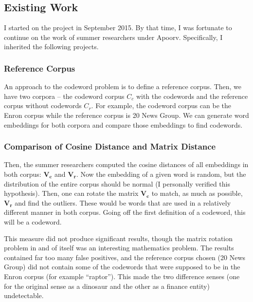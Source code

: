 \subsection{Existing Work}

I started on the project in September 2015. By that time, I was fortunate to continue on the work of summer researchers under Apoorv. Specifically, I inherited the following projects.

\subsubsection{Reference Corpus}

An approach to the codeword problem is to define a reference corpus. Then, we have two corpora -- the codeword corpus $C_c$ with the codewords and the reference corpus without codewords $C_r$. For example, the codeword corpus can be the Enron corpus while the reference corpus is 20 News Group. We can generate word embeddings for both corpora and compare those embeddings to find codewords.

\subsubsection{Comparison of Cosine Distance and Matrix Distance}

Then, the summer researchers computed the cosine distances of all embeddings in both corpus: $\mathbf{V_c}$ and $\mathbf{V_r}$. Now the embedding of a given word is random, but the distribution of the entire corpus should be normal (I personally verified this hypothesis). Then, one can rotate the matrix $\mathbf{V_c}$ to match, as much as possible, $\mathbf{V_r}$ and find the outliers. These would be words that are used in a relatively different manner in both corpus. Going off the first definition of a codeword, this will be a codeword.

This measure did not produce significant results, though the matrix rotation problem in and of itself was an interesting mathematics problem. The results contained far too many false positives, and the reference corpus chosen (20 News Group) did not contain some of the codewords that were supposed to be in the Enron corpus (for example ``raptor''). This made the two difference senses (one for the original sense as a dinosaur and the other as a finance entity) undetectable.